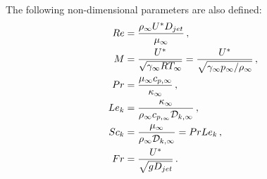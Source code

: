 The following non-dimensional parameters are also defined:
\begin{subequations}
 \begin{align}
  Re &= \frac{\rho_{\infty} U^{*} D_{jet}}{\mu_{\infty}} \, ,\\
  M  &= \frac{U^{*}}{\sqrt{\gamma_{\infty} R T_{\infty}}}= \frac{U^{*}}{\sqrt{\gamma_{\infty}
  p_{\infty} /\rho_{\infty}}} \, , \\
  Pr &= \frac{\mu_{\infty} c_{p,\infty}}{\kappa_{\infty}} \, , \\
  Le_k &= \frac{\kappa_{\infty}}{\rho_{\infty} c_{p,_{\infty}} \mathcal{D}_{k,\infty}} \, , \\
  Sc_k &= \frac{\mu_{\infty}}{\rho_{\infty} \mathcal{D}_{k,\infty}} = Pr Le_k \, , \\
  Fr &= \frac{U^{*}}{\sqrt{g D_{jet}}} \, .
 \end{align}
\end{subequations}

